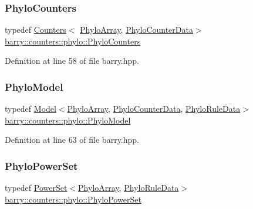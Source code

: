 \subsubsection{\texorpdfstring{Phylo\+Counters}{PhyloCounters}}
{\footnotesize\ttfamily typedef \hyperlink{classbarry_1_1_counters}{Counters}$<$ \hyperlink{namespacebarry_1_1counters_1_1phylo_abd293bf65e494e903639fb5fb2c91604}{Phylo\+Array}, \hyperlink{namespacebarry_1_1counters_1_1phylo_a6ecc0d8ab76f8dc2db152221a8e9e95a}{Phylo\+Counter\+Data}$>$ \hyperlink{namespacebarry_1_1counters_1_1phylo_a4e401ffe66d04091343dcffaf915f8c3}{barry\+::counters\+::phylo\+::\+Phylo\+Counters}}



Definition at line 58 of file barry.\+hpp.

\mbox{\label{namespacebarry_1_1counters_1_1phylo_ad32b4186e3bab93119df225fddc3c609}} 
\subsubsection{\texorpdfstring{Phylo\+Model}{PhyloModel}}
{\footnotesize\ttfamily typedef \hyperlink{classbarry_1_1_model}{Model}$<$\hyperlink{namespacebarry_1_1counters_1_1phylo_abd293bf65e494e903639fb5fb2c91604}{Phylo\+Array}, \hyperlink{namespacebarry_1_1counters_1_1phylo_a6ecc0d8ab76f8dc2db152221a8e9e95a}{Phylo\+Counter\+Data}, \hyperlink{namespacebarry_1_1counters_1_1phylo_a5da540950bcf3372bcedb17a5b23667c}{Phylo\+Rule\+Data}$>$ \hyperlink{namespacebarry_1_1counters_1_1phylo_ad32b4186e3bab93119df225fddc3c609}{barry\+::counters\+::phylo\+::\+Phylo\+Model}}



Definition at line 63 of file barry.\+hpp.

\mbox{\label{namespacebarry_1_1counters_1_1phylo_ae89de0bf34247cac5b080aeb29b25239}} 
\subsubsection{\texorpdfstring{Phylo\+Power\+Set}{PhyloPowerSet}}
{\footnotesize\ttfamily typedef \hyperlink{classbarry_1_1_power_set}{Power\+Set}$<$\hyperlink{namespacebarry_1_1counters_1_1phylo_abd293bf65e494e903639fb5fb2c91604}{Phylo\+Array}, \hyperlink{namespacebarry_1_1counters_1_1phylo_a5da540950bcf3372bcedb17a5b23667c}{Phylo\+Rule\+Data}$>$ \hyperlink{namespacebarry_1_1counters_1_1phylo_ae89de0bf34247cac5b080aeb29b25239}{barry\+::counters\+::phylo\+::\+Phylo\+Power\+Set}}



